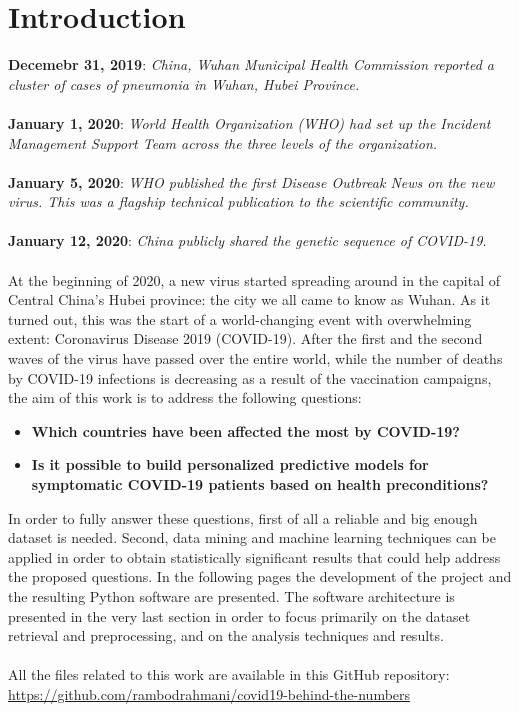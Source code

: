 \documentclass[11pt,a4paper]{article}
\begin{document}
\section{Introduction}
\textbf{Decemebr 31, 2019}: \textit{China, Wuhan Municipal Health Commission
reported a cluster of cases of pneumonia in Wuhan, Hubei Province.}\\
\\
\textbf{January 1, 2020}: \textit{World Health Organization (WHO) had set up the
Incident Management Support Team across the three levels of the organization.}\\
\\
\textbf{January 5, 2020}: \textit{WHO published the first Disease Outbreak News
on the new virus. This was a flagship technical publication to the scientific
community.}\\
\\
\textbf{January 12, 2020}: \textit{China publicly shared the genetic sequence of
COVID-19.}\\
\\
At the beginning of 2020, a new virus started spreading around in the capital of
Central China's Hubei province: the city we all came to know as Wuhan. As it
turned out, this was the start of a world-changing event with overwhelming
extent: Coronavirus Disease 2019 (COVID-19). After the first and the second
waves of the virus have passed over the entire world, while the number of deaths
by COVID-19 infections is decreasing as a result of the vaccination campaigns,
the aim of this work is to address the following questions:
\begin{itemize}
	\item \textbf{Which countries have been affected the most by COVID-19?}
	\item \textbf{Is it possible to build personalized predictive models for
		symptomatic COVID-19 patients based on health preconditions?}
\end{itemize}
In order to fully answer these questions, first of all a reliable and big enough
dataset is needed. Second, data mining and machine learning techniques can be
applied in order to obtain statistically significant results that could help
address the proposed questions. In the following pages the development of the
project and the resulting Python software are presented. The software
architecture is presented in the very last section in order to focus primarily
on the dataset retrieval and preprocessing, and on the analysis techniques and
results.\\
\\
All the files related to this work are available in this GitHub repository:
\url{https://github.com/rambodrahmani/covid19-behind-the-numbers}
\end{document}
